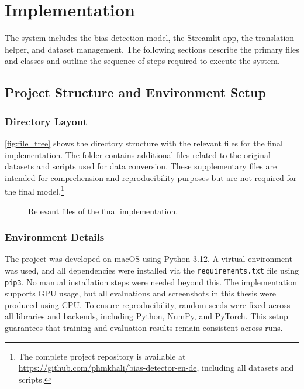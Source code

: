 \chapter{Implementation}
The system includes the bias detection model, the Streamlit app, the translation helper, and dataset management. The following sections describe the primary files and classes and outline the sequence of steps required to execute the system.

\section{Project Structure and Environment Setup}
    
\subsection{Directory Layout}

\autoref{fig:file_tree} shows the directory structure with the relevant files for the final implementation. The folder contains additional files related to the original datasets and scripts used for data conversion. These supplementary files are intended for comprehension and reproducibility purposes but are not required for the final model.\footnote{The complete project repository is available at \url{https://github.com/phmkhali/bias-detector-en-de}, including all datasets and scripts.}

\vspace{1cm} 
\begin{figure}[htb]
    \centering
    \scalebox{0.8}{}
    \caption[Relevant files of the final implementation]{Relevant files of the final implementation.}
    \label{fig:file_tree}
\end{figure}
\vspace{1cm} 

\subsection{Environment Details}
    The project was developed on macOS using Python 3.12. A virtual environment was used, and all dependencies were installed via the \texttt{requirements.txt} file using \texttt{pip3}. No manual installation steps were needed beyond this. The implementation supports GPU usage, but all evaluations and screenshots in this thesis were produced using CPU. To ensure reproducibility, random seeds were fixed across all libraries and backends, including Python, NumPy, and PyTorch. This setup guarantees that training and evaluation results remain consistent across runs.

